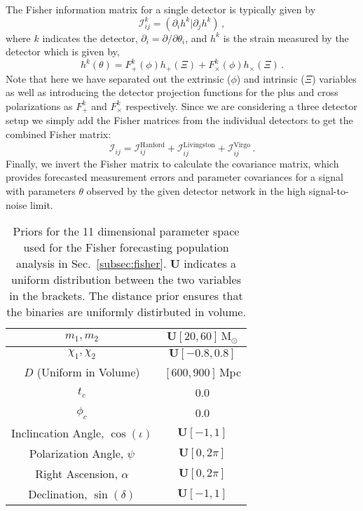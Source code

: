\documentclass[twocolumn]{aastex631}
\begin{document}
The Fisher information matrix for a single detector is typically given by 
\begin{equation}
    \label{eq:fisher}
    \mathcal{I}^{k}_{ij} = (\partial_i h^k | \partial_j h^k) \, ,
\end{equation}
where $k$ indicates the detector, $\partial_i = \partial/\partial \theta_i$, and $h^k$ is the strain measured by the detector which is given by,
\begin{equation}
    h^k(\theta) = F^k_+(\phi) h_{+}(\Xi) + F^k_\times(\phi) h_{\times}(\Xi) \, .
\end{equation}
Note that here we have separated out the extrinsic ($\phi$) and intrinsic ($\Xi$) variables as well as introducing the detector projection functions for the plus and cross polarizations as $F^k_+$ and $F^k_\times$ respectively.
Since we are considering a three detector setup we simply add the Fisher matrices from the individual detectors to get the combined Fisher matrix:
\begin{equation}
    \mathcal{I}_{ij} =  \mathcal{I}^{\mathrm{Hanford}}_{ij} + \mathcal{I}^{\mathrm{Livingston}}_{ij} + \mathcal{I}^{\mathrm{Virgo}}_{ij}   \, .
\end{equation}
Finally, we invert the Fisher matrix to calculate the covariance matrix,
which provides forecasted measurement errors and parameter covariances for a signal with parameters $\theta$ observed by the given detector network in the high signal-to-noise limit.

\begin{table}[t]
    \centering
    \begin{tabular}{c|c}
    \hline\hline

    $m_1, m_2$ & $\boldsymbol{U}[20, 60]\, \mathrm{M}_\odot$ \\ \hline
    $\chi_1, \chi_2$ & $\boldsymbol{U}[-0.8, 0.8]$ \\ \hline
    $D$ (Uniform in Volume) & $[600, 900]$\,Mpc \\ \hline
    $t_c$ & 0.0 \\ \hline
    $\phi_c$ & 0.0 \\ \hline
    Inclincation Angle, $\cos(\iota)$ & $\boldsymbol{U}[-1, 1]$ \\ \hline
    Polarization Angle, $\psi$ & $\boldsymbol{U}[0, 2\pi]$ \\ \hline
    Right Ascension, $\alpha$ & $\boldsymbol{U}[0, 2\pi]$ \\ \hline
    Declination, $\sin(\delta)$ & $\boldsymbol{U}[-1, 1]$ \\ 
    \hline\hline
    \end{tabular}
    \caption{Priors for the 11 dimensional parameter space used for the Fisher forecasting population analysis in Sec.~\ref{subsec:fisher}. 
    $\boldsymbol{U}$ indicates a uniform distribution between the two variables in the brackets. 
    The distance prior ensures that the binaries are uniformly distirbuted in volume.
    }
    \label{tab:priors}
\end{table}
\end{document}
